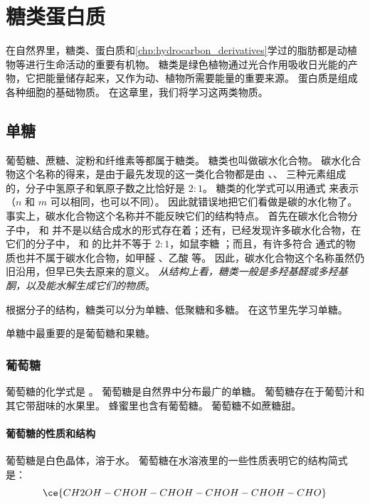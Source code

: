 \chapter{糖类\texorpdfstring{\quad}{ }蛋白质}
在自然界里，糖类、蛋白质和\cref{chp:hydrocarbon_derivatives}学过的脂肪都是动植物等进行生命活动的重要有机物。
糖类是绿色植物通过光合作用吸收日光能的产物，它把能量储存起来，又作为动、植物所需要能量的重要来源。
蛋白质是组成各种细胞的基础物质。
在这章里，我们将学习这两类物质。

\section{单糖}
葡萄糖、蔗糖、淀粉和纤维素等都属于糖类。
糖类也叫做碳水化合物。
碳水化合物这个名称的得来，是由于最先发现的这一类化合物都是由 、、 三种元素组成的，分子中氢原子和氧原子数之比恰好是 $2:1$。
糖类的化学式可以用通式  来表示（$n$ 和 $m$ 可以相同，也可以不同）。
因此就错误地把它们看做是碳的水化物了。
事实上，碳水化合物这个名称并不能反映它们的结构特点。
首先在碳水化合物分子中， 和  并不是以结合成水的形式存在着；还有，已经发现许多碳水化合物，在它们的分子中， 和  的比并不等于 $2:1$，如鼠李糖 ；而且，有许多符合  通式的物质也并不属于碳水化合物，如甲醛 、乙酸  等。
因此，碳水化合物这个名称虽然仍旧沿用，但早已失去原来的意义。
\emph{从结构上看，糖类一般是多羟基醛或多羟基酮，以及能水解生成它们的物质}。

根据分子的结构，糖类可以分为单糖、低聚糖和多糖。
在这节里先学习单糖。

单糖中最重要的是葡萄糖和果糖。
\subsection{葡萄糖}
葡萄糖的化学式是 。
葡萄糖是自然界中分布最广的单糖。
葡萄糖存在于葡萄汁和其它带甜味的水果里。
蜂蜜里也含有葡萄糖。
葡萄糖不如蔗糖甜。

\subsubsection{葡萄糖的性质和结构}
葡萄糖是白色晶体，溶于水。
葡萄糖在水溶液里的一些性质表明它的结构简式是：
\[ \ce{CH2OH-CHOH-CHOH-CHOH-CHOH-CHO } \]

